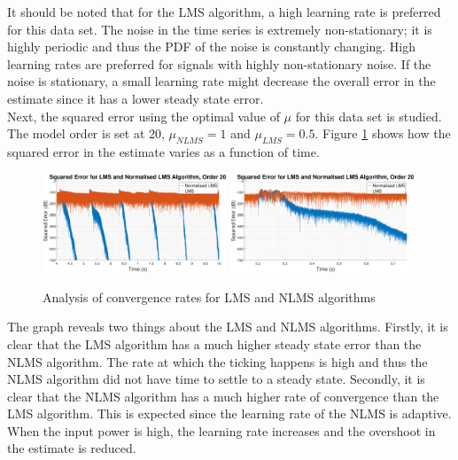 \documentclass{article}
\begin{document}
It should be noted that for the LMS algorithm, a high learning rate is preferred for this data set. The noise in the time series is extremely non-stationary; it is highly periodic and thus the PDF of the noise is constantly changing. High learning rates are preferred for signals with highly non-stationary noise. If the noise is stationary, a small learning rate might decrease the overall error in the estimate since it has a lower steady state error.\\

Next, the squared error using the optimal value of $\mu$ for this data set is studied. The model order is set at 20, $\mu_{NLMS} = 1$ and $\mu_{LMS} = 0.5$. Figure \ref{fig:squared_error} shows how the squared error in the estimate varies as a function of time. 


\begin{figure}[H]
    \centering
    \includegraphics[width=0.49\textwidth]{squared_error_comparison}
    \includegraphics[width=0.49\textwidth]{squared_error_comparison_zoom}
    \caption{Analysis of convergence rates for LMS and NLMS algorithms}
    \label{fig:squared_error}
\end{figure}

The graph reveals two things about the LMS and NLMS algorithms. Firstly, it is clear that the LMS algorithm has a much higher steady state error than the NLMS algorithm. The rate at which the ticking happens is high and thus the NLMS algorithm did not have time to settle to a steady state. Secondly, it is clear that the NLMS algorithm has a much higher rate of convergence than the LMS algorithm. This is expected since the learning rate of the NLMS is adaptive. When the input power is high, the learning rate increases and the overshoot in the estimate is reduced.\\
\end{document}
